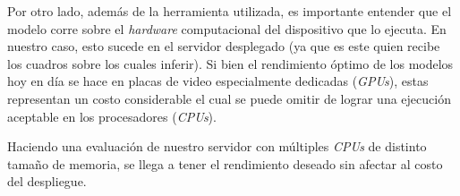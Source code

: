 \documentclass[a4paper]{article}
\begin{document}
\begin{figure}[H]
\end{figure}

Por otro lado, además de la herramienta utilizada, es importante entender que el modelo corre sobre el \textit{hardware} computacional del dispositivo que lo ejecuta. En nuestro caso, esto sucede en el servidor desplegado (ya que es este quien recibe los cuadros sobre los cuales inferir). Si bien el rendimiento óptimo de los modelos hoy en día se hace en placas de video especialmente dedicadas (\textit{GPUs}), estas representan un costo considerable el cual se puede omitir de lograr una ejecución aceptable en los procesadores (\textit{CPUs}).

Haciendo una evaluación de nuestro servidor con múltiples \textit{CPUs} de distinto tamaño de memoria, se llega a tener el rendimiento deseado sin afectar al costo del despliegue.
\end{document}
